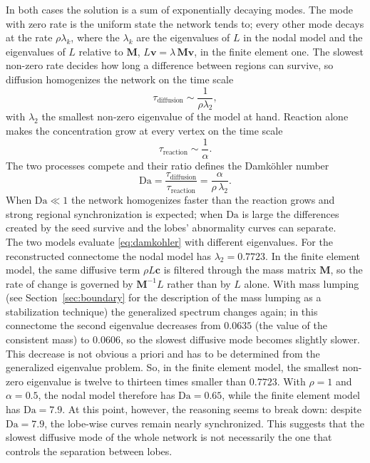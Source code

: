 In both cases the solution is a sum of exponentially decaying modes. The mode with zero rate is the uniform state the network tends to; every other mode decays at the rate $\rho\lambda_k$, where the $\lambda_k$ are the eigenvalues of $L$ in the nodal model and the eigenvalues of $L$ relative to $\mathbf{M}$, $L\mathbf{v} = \lambda\,\mathbf{M}\mathbf{v}$, in the finite element one. The slowest non-zero rate decides how long a difference between regions can survive, so diffusion homogenizes the network on the time scale
\[
\tau_{\mathrm{diffusion}} \sim \frac{1}{\rho\lambda_2},
\]
with $\lambda_2$ the smallest non-zero eigenvalue of the model at hand. Reaction alone makes the concentration grow at every vertex on the time scale
\[
\tau_{\mathrm{reaction}} \sim \frac{1}{\alpha}.
\]
\noindent
The two processes compete and their ratio defines the
Damk\"ohler number
\begin{equation}
\mathrm{Da}
  = \frac{\tau_{\mathrm{diffusion}}}{\tau_{\mathrm{reaction}}}
  = \frac{\alpha}{\rho\,\lambda_2}.
\label{eq:damkohler}
\end{equation}
When $\mathrm{Da}\ll1$ the network homogenizes faster than the reaction grows and strong regional synchronization is expected; when $\mathrm{Da}$ is large the differences created by the seed survive and the lobes' abnormality curves can separate.\\
The two models evaluate \eqref{eq:damkohler} with different eigenvalues. For the reconstructed connectome the nodal model has $\lambda_2 = 0.7723$. In the finite element model, the same diffusive term $\rho L\mathbf{c}$ is filtered through the mass matrix $\mathbf{M}$, so the rate of change is governed by $\mathbf{M}^{-1}L$ rather than by $L$ alone. With mass lumping (see Section~\ref{sec:boundary} for the description of the mass lumping as a stabilization technique) the generalized spectrum changes again; in this connectome the second eigenvalue decreases from $0.0635$ (the value of the consistent mass) to $0.0606$, so the slowest diffusive mode becomes slightly slower. This decrease is not obvious a priori and has to be determined from the generalized eigenvalue problem. So, in the finite element model, the smallest non-zero eigenvalue is twelve to thirteen times smaller than $0.7723$. With $\rho=1$ and $\alpha=0.5$, the nodal model therefore has $\mathrm{Da}=0.65$, while the finite element model has $\mathrm{Da}=7.9$. At this point, however, the reasoning seems to break down: despite $\mathrm{Da}=7.9$, the lobe-wise curves remain nearly synchronized. This suggests that the slowest diffusive mode of the whole network is not necessarily the one that controls the separation between lobes.\\
